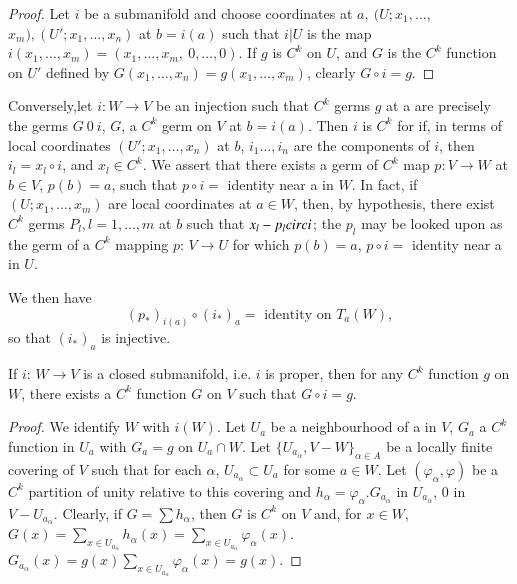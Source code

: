 \begin{proof}
  Let $i$ be a submanifold and choose coordinates at $a, ~ (U; x_1,
  \ldots$, $x_m), (U'; x_1, \ldots, x_n)$  at $b = i(a)$ such that $i
  \Big| U$ is the map $i (x_1, \ldots, x_m) = (x_1, \ldots,x_m, ~ 0,
  \ldots, 0)$. If $g$ is $C^k$ on $U$, and $G$ is the $C^k$ function
  on $U'$ defined by $G(x_1, \ldots, x_n) =  g (x_1, \ldots, x_m)$,
  clearly $G \circ i  = g$. 
\end{proof}

Conversely,\pageoriginale let $i: W \to V$ be an injection such that $C^k$ germs $g$
at a are precisely the germs $G ~ 0 ~ i$, $G$, a $C^k $ germ on $V$ at
$b = i (a)$. Then $i$ is $C^k$ for if, in terms of local coordinates
$(U'; x_1, \ldots, x_n)$ at $b$,  $i_1 \ldots, i_n$ are the
components of $i$, then $i_l = x_l \circ i$, and $x_l \in C^k$. We assert
that there exists a germ of $C^k$ map $p : V \to W$ at $b \in V$, $ p
(b) = a$, such that $p \circ i =$ identity near a in $W$. In fact, if $(U;
x_1, \ldots, x_m)$ are local coordinates at $a \in W$, then, by
hypothesis, there exist $C^k$ germs $P_l,  l = 1, \ldots , m$ at $b$
such that $x_l - p_l \\circ i$; the $p_l$ may be looked upon as the germ of
a $C^k$ mapping $p$: $V \to U$ for which $p (b) = a$, $p \circ i =$
identity near a in $U$. 

We then have 
$$
(p_*)_{i (a)} \circ (i_*)_a = \text{ identity on } T_a (W),
$$
so that $(i_*)_a$ is injective.

\begin{proposition}\label{chap2:sec3:prop4}%
  If $i$: $W \to V$ is a closed submanifold, i.e. $i$ is proper, then
  for any $C^k$ function $g$ on $W$, there exists a $C^k$ function $G$
  on $V$ such that $G \circ i = g$. 
\end{proposition}

\begin{proof}
  We identify $W$ with $i(W)$. Let $U_a$ be a neighbourhood of a in
  $V$, $G_a$  a $C^k$ function in $U_a$ with $G_a = g$ on $U_a \cap
  W$. Let  $\big\{ U_{a_{\alpha}}, V- W \big \}_{\alpha \in A}$ be a
  locally finite covering of $V$ such that for each $\alpha$,
  $U_{a_{\alpha}} \subset U_a$ for some $a \in W$. Let
  $(\varphi_\alpha, \varphi )$ be a $C^k$ partition of unity relative
  to this covering and $h_\alpha = \varphi_\alpha. G_{a_{\alpha}}$ in
  $U_{a_\alpha}$, 0 in $V -U_{a_{\alpha}}$. Clearly, if $G = \sum h_\alpha$,
  then $G$ is $C^k$ on $V$ and, for $x \in W$, $G (x) = \sum\limits_{x
    \in U_{a_{\alpha}}} h_\alpha (x) =  \sum \limits_{x \in
    U_{a_{\alpha}}} \varphi_\alpha (x)$. $G_{a_{\alpha}} (x) = g (x)
  \sum\limits_{x \in U_{a_{\alpha}}} \varphi_\alpha (x) = g (x)$. 
\end{proof}


